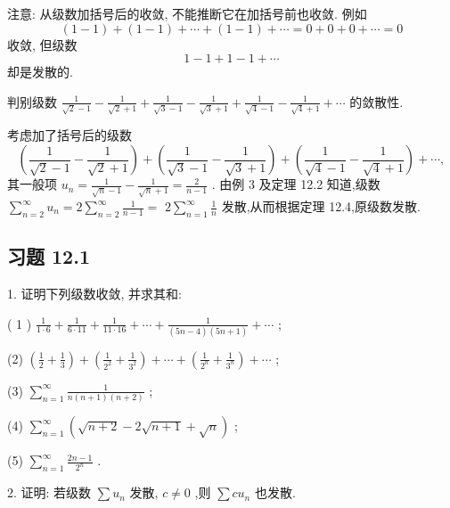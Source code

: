 注意: 从级数加括号后的收敛, 不能推断它在加括号前也收敛. 例如
\[
\left( {1 - 1}\right)  + \left( {1 - 1}\right)  + \cdots  + \left( {1 - 1}\right)  + \cdots  = 0 + 0 + 0 + \cdots  = 0
\]
收敛, 但级数
\[
1 - 1 + 1 - 1 + \cdots
\]
却是发散的.

\begin{example}

\end{example}
判别级数 \(\frac{1}{\sqrt{2} - 1} - \frac{1}{\sqrt{2} + 1} + \frac{1}{\sqrt{3} - 1} - \frac{1}{\sqrt{3} + 1} + \frac{1}{\sqrt{4} - 1} - \frac{1}{\sqrt{4} + 1} + \cdots\) 的敛散性.

\begin{solution}

\end{solution}
考虑加了括号后的级数
\[
\left( {\frac{1}{\sqrt{2} - 1} - \frac{1}{\sqrt{2} + 1}}\right)  + \left( {\frac{1}{\sqrt{3} - 1} - \frac{1}{\sqrt{3} + 1}}\right)  + \left( {\frac{1}{\sqrt{4} - 1} - \frac{1}{\sqrt{4} + 1}}\right)  + \cdots ,
\]
其一般项 \({u}_{n} = \frac{1}{\sqrt{n} - 1} - \frac{1}{\sqrt{n} + 1} = \frac{2}{n - 1}\) . 由例 3 及定理 12.2 知道,级数 \(\mathop{\sum }\limits_{{n = 2}}^{\infty }{u}_{n} = 2\mathop{\sum }\limits_{{n = 2}}^{\infty }\frac{1}{n - 1} =\)  \(2\mathop{\sum }\limits_{{n = 1}}^{\infty }\frac{1}{n}\) 发散,从而根据定理 12.4,原级数发散.

\subsection{习题 12.1}

1. 证明下列级数收敛, 并求其和:

( 1 ) \(\frac{1}{1 \cdot  6} + \frac{1}{6 \cdot  {11}} + \frac{1}{{11} \cdot  {16}} + \cdots  + \frac{1}{\left( {{5n} - 4}\right) \left( {{5n} + 1}\right) } + \cdots\) ;

(2) \(\left( {\frac{1}{2} + \frac{1}{3}}\right)  + \left( {\frac{1}{{2}^{2}} + \frac{1}{{3}^{2}}}\right)  + \cdots  + \left( {\frac{1}{{2}^{n}} + \frac{1}{{3}^{n}}}\right)  + \cdots\) ;

(3) \(\mathop{\sum }\limits_{{n = 1}}^{\infty }\frac{1}{n\left( {n + 1}\right) \left( {n + 2}\right) }\) ;

(4) \(\mathop{\sum }\limits_{{n = 1}}^{\infty }\left( {\sqrt{n + 2} - 2\sqrt{n + 1} + \sqrt{n}}\right)\) ;

(5) \(\mathop{\sum }\limits_{{n = 1}}^{\infty }\frac{{2n} - 1}{{2}^{n}}\) .

2. 证明: 若级数 \(\sum {u}_{n}\) 发散, \(c \neq  0\) ,则 \(\sum c{u}_{n}\) 也发散.

